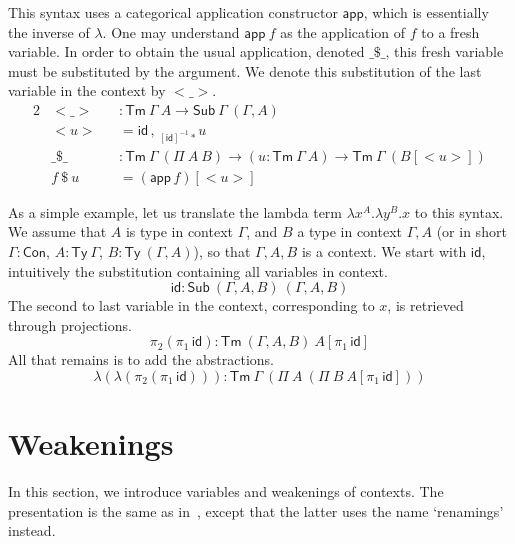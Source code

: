 \documentclass[a4paper,UKenglish,cleveref]{lipics-v2019}
\newcommand{\agdaSymb}[1]{\mathsf{#1}}
\newcommand{\Ty}{\agdaSymb{Ty}}
\newcommand{\Con}{\agdaSymb{Con}}
\newcommand{\Tms}{\agdaSymb{Sub}}
\newcommand{\Tm}{\agdaSymb{Tm}}
\newcommand{\id}{\agdaSymb{id}}
\newcommand{\app}{\agdaSymb{app}}
\newcommand{\lam}{\lambda}
\begin{document}
This syntax uses a categorical application constructor $\app$, which is
essentially the inverse of $\lam$. One may understand $\app\ f$ as the
application of $f$ to a fresh variable. In order to obtain the usual
application, denoted $\_\$\_$, this fresh variable must be substituted by the
argument. We denote this substitution of the last variable in the context by
$<\_>$.
\begin{alignat*}{2}
  & <\_> && : \Tm\ \Gamma\ A \to \Tms\ \Gamma\ (\Gamma,A) \\ & <u> && = \id\,,\,_{[\id]^{-1} *}u \\
  & \_\$\_ && : \Tm\ \Gamma\ (\Pi\ A\ B) \to (u : \Tm\ \Gamma\ A) \to \Tm\ \Gamma\ (B[<u>]) \\
  & f\ \$\ u && = (\app\, f)[<u>]
\end{alignat*}

As a simple example, let us translate the lambda term $\lambda x^A . \lambda
y^B . x$ to this syntax. We assume that $A$ is type in context $\Gamma$, and
$B$ a type in context $\Gamma,A$ (or in short $\Gamma:\Con$, $A:\Ty\ \Gamma$,
$B:\Ty\ (\Gamma,A)$), so that $\Gamma,A,B$ is a context.
We start with $\id$, intuitively the substitution containing all variables in
context.
\[ \id : \Tms\ (\Gamma,A,B)\ (\Gamma,A,B) \]
The second to last variable in the context, corresponding to $x$, is retrieved
through projections.
\[ \pi_2 (\pi_1\,\id) : \Tm\ (\Gamma,A,B)\ A[\pi_1\,\id] \]
All that remains is to add the abstractions.
\[ \lam (\lam (\pi_2 (\pi_1\,\id))) : \Tm\ \Gamma\ (\Pi\ A\ (\Pi\ B\ A[\pi_1\,\id])) \]

\section{Weakenings}
\label{sec:weakening}
In this section, we introduce variables and weakenings of contexts. The
presentation is the same as in~\cite{kaposi2016normalisation}, except that the
latter uses the name `renamings' instead.
\end{document}
